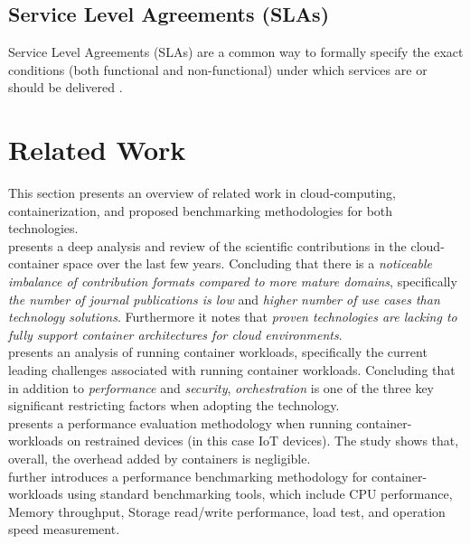 \subsection*{Service Level Agreements (SLAs)}
Service Level Agreements (SLAs) are a common way to formally specify the exact
conditions (both functional and non-functional) under which services are or should
be delivered \cite{wieder2011service}.


\section{Related Work}

This section presents an overview of related work in cloud-computing, containerization, and proposed benchmarking methodologies for both technologies. \\

\noindent \cite{pahl2017cloud} presents a deep analysis and review of the scientific contributions in the cloud-container space over the last few years.
Concluding that there is a \emph{noticeable imbalance of contribution formats compared to more mature domains}, specifically 
\emph{the number of journal publications is low} and \emph{higher number of use cases than technology solutions}. 
Furthermore it notes that \emph{proven technologies are lacking to fully support container architectures for cloud environments}. \\

\noindent \cite{https://doi.org/10.1002/cpe.5668} presents an analysis of running container workloads, specifically the current leading challenges associated with running container workloads.
Concluding that in addition to \emph{performance} and \emph{security}, \emph{orchestration} is one of the three key significant restricting factors when adopting the technology. \\

\noindent \cite{7562228} presents a performance evaluation methodology when running container-workloads on restrained devices 
(in this case IoT devices).
The study shows that, overall, the overhead added by containers is negligible. \\

\noindent \cite{POTDAR20201419} further introduces a performance benchmarking methodology for container-workloads using standard benchmarking tools, 
which include CPU performance, Memory throughput, Storage read/write performance, load test, and operation speed measurement. \\

